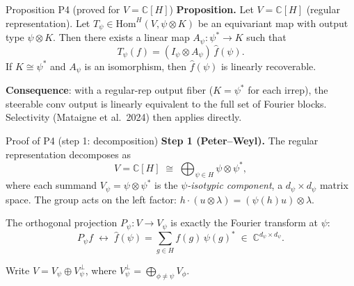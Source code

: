\documentclass[aspectratio=169]{beamer}
\newcommand{\Hom}{\mathrm{Hom}}
\newcommand{\C}{\mathbb{C}}
\begin{document}
\begin{frame}{Proposition P4 (proved for $V = \C[H]$)}
  \textbf{Proposition.} Let $V = \C[H]$ (regular representation). Let $T_\psi \in \Hom^H(V, \psi \otimes K)$ be an equivariant map with output type $\psi \otimes K$. Then there exists a linear map $A_\psi : \psi^* \to K$ such that
  \[
    T_\psi(f) = (I_\psi \otimes A_\psi) \, \hat{f}(\psi).
  \]
  If $K \cong \psi^*$ and $A_\psi$ is an isomorphism, then $\hat{f}(\psi)$ is linearly recoverable.

  \bigskip

  \textbf{Consequence}: with a regular-rep output fiber ($K = \psi^*$ for each irrep), the steerable conv output is linearly equivalent to the full set of Fourier blocks. Selectivity (Mataigne et al.\ 2024) then applies directly.
\end{frame}

\begin{frame}{Proof of P4 (step 1: decomposition)}\small
  \textbf{Step 1 (Peter--Weyl).} The regular representation decomposes as
  \[
    V = \C[H] \;\cong\; \bigoplus_{\psi \in \widehat{H}} \psi \otimes \psi^*,
  \]
  where each summand $V_\psi = \psi \otimes \psi^*$ is the \textit{$\psi$-isotypic component}, a $d_\psi \times d_\psi$ matrix space. The group acts on the left factor: $h \cdot (u \otimes \lambda) = (\psi(h)u) \otimes \lambda$.

  \medskip

  The orthogonal projection $P_\psi : V \to V_\psi$ is exactly the Fourier transform at $\psi$:
  \[
    P_\psi f \;\longleftrightarrow\; \hat{f}(\psi) = \sum_{g \in H} f(g)\,\psi(g)^* \;\in\; \C^{d_\psi \times d_\psi}.
  \]

  \medskip

  Write $V = V_\psi \oplus V_\psi^\perp$, where $V_\psi^\perp = \bigoplus_{\phi \neq \psi} V_\phi$.
\end{frame}
\end{document}
